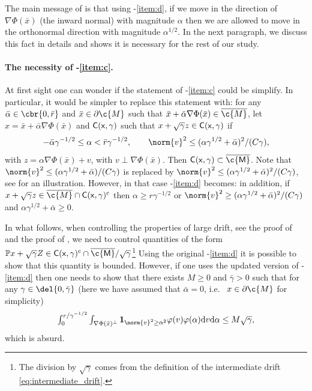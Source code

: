 The main message of  is that using -\ref{item:d}, if we move in the direction of $\nabla \Phi(\bar{x})$ (the inward normal) with magnitude $\alpha$ then we are allowed to move in the orthonormal direction with magnitude $\alpha^{1/2}$.
In the next paragraph, we discuss this fact in details and shows it is necessary for the rest of our study.

\paragraph{The necessity of -\ref{item:c}.}

At first sight one can wonder if the statement of -\ref{item:c} could be simplify.
In particular, it would be simpler to replace this statement with: for any $\bar{\alpha} \in \cbr{0,\bar{r}}$ and $\bar{x} \in \partial \c{M}$ such that $\bar{x} + \bar{\alpha} \nabla \Phi(\bar{x}) \in \cl{\c{M}}$, let $x = \bar{x} + \bar{\alpha} \nabla \Phi(\bar{x})$ and $\sf{C}(x, \gamma)$ such that $x + \sqrt{\gamma}z \in \sf{C}(x,\gamma)$ if \begin{equation} -\bar{\alpha}\gamma^{-1/2} \leq \alpha < \bar{r} \gamma^{-1/2} , \qquad \norm{v}^2 \leq ( \alpha \gamma^{1/2} + \bar{\alpha})^2/(C\gamma), \label{eq:def_msc_illus} \end{equation} with $z = \alpha \nabla \Phi(\bar{x}) + v$, with $v \perp \nabla \Phi(\bar{x})$.
Then $\sf{C}(x, \gamma) \subset \cl{\c{M}}$.
Note that $\norm{v}^2 \leq ( \alpha \gamma^{1/2} + \bar{\alpha})/(C\gamma)$ is replaced by $\norm{v}^2 \leq ( \alpha \gamma^{1/2} + \bar{\alpha})^2/(C\gamma)$, see  for an illustration.
However, in that case -\ref{item:d} becomes: in addition, if $x + \sqrt{\gamma}z \in \cl{\c{M}} \cap \sf{C}(x,\gamma)^\mathrm{c}$ then $\alpha \geq r\gamma^{-1/2}$ or $\norm{v}^2 \geq ( \alpha \gamma^{1/2} + \bar{\alpha})^2/(C\gamma)$ and $\alpha \gamma^{1/2} + \bar{\alpha} \geq 0$.

In what follows, when controlling the properties of large drift, see the proof of  and the proof of , we need to control quantities of the form $\bb{P}{x + \sqrt{\gamma} Z \in \sf{C}(x, \gamma)^\mathrm{c} \cap \cl{\c{M}}} /\sqrt{\gamma}$\footnote{The division by $\sqrt{\gamma}$ comes from the definition of the intermediate drift \eqref{eq:intermediate_drift}.
}
Using the original -\ref{item:d} it is possible to show that this quantity is bounded.
However, if one uses the updated version of -\ref{item:d} then one needs to show that there exists $M \geq 0$ and $\bar{\gamma} >0$ such that for any $\gamma \in \del{0, \bar{\gamma}}$ (here we have assumed that $\bar{\alpha} = 0$, i.e.~ $x \in \partial \c{M}$ for simplicity) \begin{equation} \textstyle \int_{0}^{r/\gamma^{-1/2}} \int_{\nabla \Phi(\bar{x})^\perp} \bm{1}_{\norm{v}^2 \geq \alpha^2} \varphi(v) \varphi(\alpha) \mathrm{d} v \mathrm{d} \alpha \leq M \sqrt{\gamma} , \end{equation} which is absurd.

